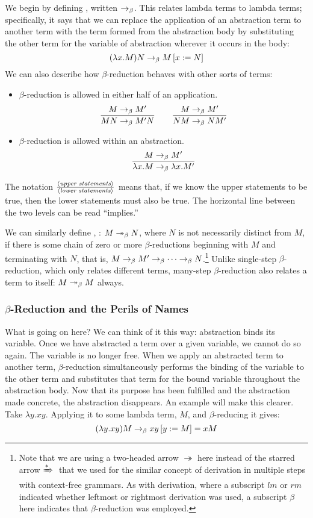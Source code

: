 We begin by defining , written $\betared$. This relates lambda terms to lambda terms; specifically, it says that we can replace the application of an abstraction term to another term with the term formed from the abstraction body by substituting the other term for the variable of abstraction wherever it occurs in the body:
\[
(\lambda x . M) N \betared \replace{x}{N}{M}
\]
We can also describe how $\beta$-reduction behaves with other sorts of terms:
\begin{itemize}
\item $\beta$-reduction is allowed in either half of an application.
\[
\frac{M \betared M\prime}{M N \betared M\prime N}
\qquad
\frac{M \betared M\prime}{N M \betared N M\prime}
\]
\item $\beta$-reduction is allowed within an abstraction.
\[
\frac{M \betared M\prime}{\lambda x.M \betared \lambda x.M\prime}
\]
\end{itemize}
The notation $\frac{\langle\text{\textit{upper statements}}\rangle}{\langle\text{\textit{lower statements}}\rangle}$ means that, if we know the upper statements to be true, then the lower statements must also be true. The horizontal line between the two levels can be read ``implies.''

We can similarly define , \betared[*]: $M \betared[*] N$, where $N$ is not necessarily distinct from $M$, if there is some chain of zero or more $\beta$-reductions beginning with $M$ and terminating with $N$, that is, $M \betared M\prime \betared \dotsb \betared N$.\footnote{Note that we are using a two-headed arrow $\twoheadrightarrow$ here instead of the starred arrow $\derives[*]{}$ that we used for the similar concept of derivation in multiple steps with context-free grammars. As with derivation, where a subscript $lm$ or $rm$ indicated whether leftmost or rightmost derivation was used, a subscript $\beta$ here indicates that $\beta$-reduction was employed.} Unlike single-step $\beta$-reduction, which only relates different terms, many-step $\beta$-reduction also relates a term to itself: $M \betared[*] M$ always.

\subsubsection{\texorpdfstring{$\beta$-Reduction and the Perils of Names}{Beta-Reduction and the Perils of Names}}\label{untyped:nameperils}
What is going on here? We can think of it this way: abstraction binds its variable. Once we have abstracted a term over a given variable, we cannot do so again. The variable is no longer free. When we apply an abstracted term to another term, $\beta$-reduction simultaneously performs the binding of the variable to the other term and substitutes that term for the bound variable throughout the abstraction body. Now that its purpose has been fulfilled and the abstraction made concrete, the abstraction disappears. An example will make this clearer. Take $\lambda y . xy$. Applying it to some lambda term, $M$, and $\beta$-reducing it gives:
\[
(\lambda y . xy) M \betared \replace{y}{M}{xy} = xM
\]

